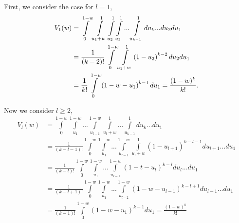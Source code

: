 \documentclass{llncs}
\begin{document}

First, we consider the case for $l = 1$,
\begin{align}
 V_{1}(w) &=  \displaystyle \displaystyle  \int\limits_0^{1-w}\int\limits_{{u_1}+w}^1\int\limits_{u_2}^1\int\limits_{u_3}^1...\int\limits_{u_{k-1}}^1 du_k...du_2 du_1 \nonumber \\ 
& = \displaystyle \frac{1}{(k-2)!}\int\limits_0^{1-w}\int\limits_{{u_1}+w}^1\left( 1-u_2 \right)^{k-2} du_2 du_1 \nonumber \\
& = \displaystyle \frac{1}{k!} \int\limits_0^{1-w}\left( 1-w-u_1 \right)^{k-1} du_1 = \frac{(1-w)^k}{k!}. \label{eq:p_1}
\end{align}

Now we consider $l\ge 2$,
\begin{align}
V_{l}(w) & = \displaystyle \int\limits_0^{1-w}\int\limits_{{u_1}}^{1-w}...\int\limits_{u_{l-1}}^{1-w}\int\limits_{u_l+w}^1...\int\limits_{u_{k-1}}^1 du_k... du_1  \nonumber \\ 
& =  \displaystyle \frac{1}{(k-l-1)!}\displaystyle \int\limits_0^{1-w}\int\limits_{{u_1}}^{1-w}...\int\limits_{u_{l-1}}^{1-w}\int\limits_{u_l+w}^1 \left( 1-u_{l+1} \right)^{k-l-1} du_{l+1}...du_1   \nonumber \\
&=  \displaystyle \frac{1}{(k-l)!}\displaystyle \int\limits_0^{1-w}\int\limits_{{u_1}}^{1-w}...\int\limits_{u_{l-1}}^{1-w} \left( 1-t-u_{l} \right)^{k-l} du_l...du_1   \nonumber \\
& = \displaystyle \frac{1}{(k-l+1)!}\displaystyle \int\limits_0^{1-w}\int\limits_{{u_1}}^{1-w}...\int\limits_{u_{l-2}}^{1-w} \left( 1-w-u_{l-1} \right)^{k-l+1} du_{l-1}...du_1   \nonumber \\
& =  \displaystyle \frac{1}{(k-1)!} \int\limits_0^{1-w}\left( 1-w-u_1 \right)^{k-1} du_1 = \frac{(1-w)^k}{k!} \label{eq:p_k}
\end{align}
\end{document}
